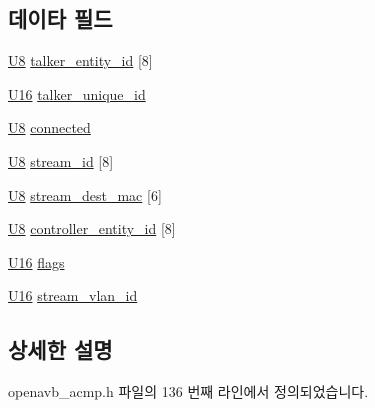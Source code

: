 \subsection*{데이타 필드}
\begin{DoxyCompactItemize}
\item 
\hyperlink{openavb__types__base__pub_8h_aa63ef7b996d5487ce35a5a66601f3e73}{U8} \hyperlink{structopenavb__acmp___listener_stream_info__t_a9a599b9c25c2171c3e76f269d9a04f51}{talker\+\_\+entity\+\_\+id} \mbox{[}8\mbox{]}
\item 
\hyperlink{openavb__types__base__pub_8h_a0a0a322d5fa4a546d293a77ba8b4a71f}{U16} \hyperlink{structopenavb__acmp___listener_stream_info__t_a545e994bde6218210bb41265ac298837}{talker\+\_\+unique\+\_\+id}
\item 
\hyperlink{openavb__types__base__pub_8h_aa63ef7b996d5487ce35a5a66601f3e73}{U8} \hyperlink{structopenavb__acmp___listener_stream_info__t_afc3b222bd9438308817c4483cf6a61af}{connected}
\item 
\hyperlink{openavb__types__base__pub_8h_aa63ef7b996d5487ce35a5a66601f3e73}{U8} \hyperlink{structopenavb__acmp___listener_stream_info__t_a75d8c196686b96d97e0a271ac7b70da8}{stream\+\_\+id} \mbox{[}8\mbox{]}
\item 
\hyperlink{openavb__types__base__pub_8h_aa63ef7b996d5487ce35a5a66601f3e73}{U8} \hyperlink{structopenavb__acmp___listener_stream_info__t_a26087f365a751a1415364bfb5e2b8a0e}{stream\+\_\+dest\+\_\+mac} \mbox{[}6\mbox{]}
\item 
\hyperlink{openavb__types__base__pub_8h_aa63ef7b996d5487ce35a5a66601f3e73}{U8} \hyperlink{structopenavb__acmp___listener_stream_info__t_a8b74ba582b9c19e1f2e475925f7cfb2f}{controller\+\_\+entity\+\_\+id} \mbox{[}8\mbox{]}
\item 
\hyperlink{openavb__types__base__pub_8h_a0a0a322d5fa4a546d293a77ba8b4a71f}{U16} \hyperlink{structopenavb__acmp___listener_stream_info__t_a492b33861e809623846e5256d271bc78}{flags}
\item 
\hyperlink{openavb__types__base__pub_8h_a0a0a322d5fa4a546d293a77ba8b4a71f}{U16} \hyperlink{structopenavb__acmp___listener_stream_info__t_a31db70d552fc6f5d35875430fca593e6}{stream\+\_\+vlan\+\_\+id}
\end{DoxyCompactItemize}


\subsection{상세한 설명}


openavb\+\_\+acmp.\+h 파일의 136 번째 라인에서 정의되었습니다.



